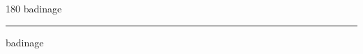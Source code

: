 
\begin{frame}
\begin{center}
\begin{turn}{180}
{\fontsize{2.5cm}{1em}\selectfont badinage}
\end{turn}
\vspace{1em}\par  
\hrule
\vspace{1em}\par  
{\fontsize{2.5cm}{1em}\selectfont badinage}
\end{center}
\end{frame}
